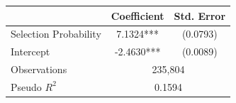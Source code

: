 \begin{tabular}{lcc}
\toprule
 & Coefficient & Std. Error \\
\midrule
Selection Probability & 7.1324*** & (0.0793) \\
Intercept & -2.4630*** & (0.0089) \\
\midrule
Observations & \multicolumn{2}{c}{235,804} \\
Pseudo $R^2$ & \multicolumn{2}{c}{0.1594} \\
\bottomrule
\end{tabular}
